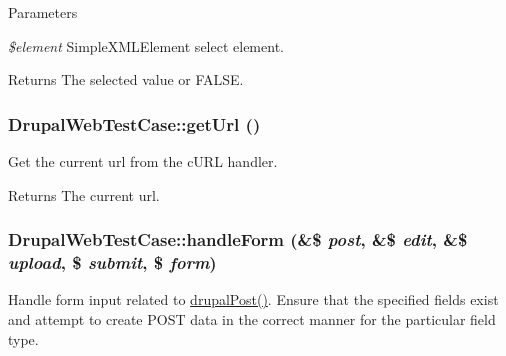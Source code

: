 \begin{DoxyParams}{Parameters}
\item[{\em \$element}]SimpleXMLElement select element. \end{DoxyParams}
\begin{DoxyReturn}{Returns}
The selected value or FALSE. 
\end{DoxyReturn}
\hypertarget{class_drupal_web_test_case_a71fa7ff2a1b0b76829605458e875c9a0}{
\subsubsection[{getUrl}]{\setlength{\rightskip}{0pt plus 5cm}DrupalWebTestCase::getUrl ()}}
\label{class_drupal_web_test_case_a71fa7ff2a1b0b76829605458e875c9a0}
Get the current url from the cURL handler.

\begin{DoxyReturn}{Returns}
The current url. 
\end{DoxyReturn}
\hypertarget{class_drupal_web_test_case_af28fa56d6175e845d39c2db518544633}{
\subsubsection[{handleForm}]{\setlength{\rightskip}{0pt plus 5cm}DrupalWebTestCase::handleForm (\&\$ {\em post}, \/  \&\$ {\em edit}, \/  \&\$ {\em upload}, \/  \$ {\em submit}, \/  \$ {\em form})}}
\label{class_drupal_web_test_case_af28fa56d6175e845d39c2db518544633}
Handle form input related to \hyperlink{class_drupal_web_test_case_aa773e6bf6ff8d0085dc60fb6d9ba888e}{drupalPost()}. Ensure that the specified fields exist and attempt to create POST data in the correct manner for the particular field type.


